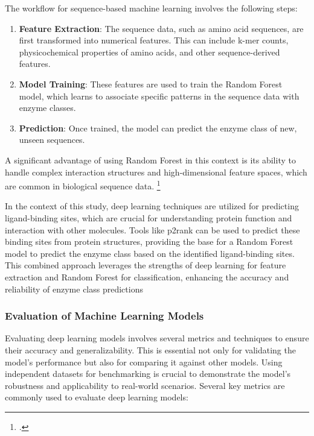 The workflow for sequence-based machine learning involves the following steps:

\begin{enumerate}
    \item \textbf{Feature Extraction}: The sequence data, such as amino acid sequences, are first transformed into numerical features. This can include k-mer counts, physicochemical properties of amino acids, and other sequence-derived features.
    \item \textbf{Model Training}: These features are used to train the Random Forest model, which learns to associate specific patterns in the sequence data with enzyme classes.
    \item \textbf{Prediction}: Once trained, the model can predict the enzyme class of new, unseen sequences.
\end{enumerate}

A significant advantage of using Random Forest in this context is its ability to handle complex interaction structures and high-dimensional feature spaces, which are common in biological sequence data. \footcite{diaz-uriarteGeneSelectionClassification2006}

In the context of this study, deep learning techniques are utilized for predicting ligand-binding sites, which are crucial for understanding protein function and interaction with other molecules. Tools like p2rank can be used to predict these binding sites from protein structures, providing the base for a Random Forest model to predict the enzyme class based on the identified ligand-binding sites. This combined approach leverages the strengths of deep learning for feature extraction and Random Forest for classification, enhancing the accuracy and reliability of enzyme class predictions

\subsubsection{Evaluation of Machine Learning Models}
\label{sec:Evaluation of Machine Learning Models}

Evaluating deep learning models involves several metrics and techniques to ensure their accuracy and generalizability. This is essential not only for validating the model’s performance but also for comparing it against other models. Using independent datasets for benchmarking is crucial to demonstrate the model's robustness and applicability to real-world scenarios. Several key metrics are commonly used to evaluate deep learning models:

